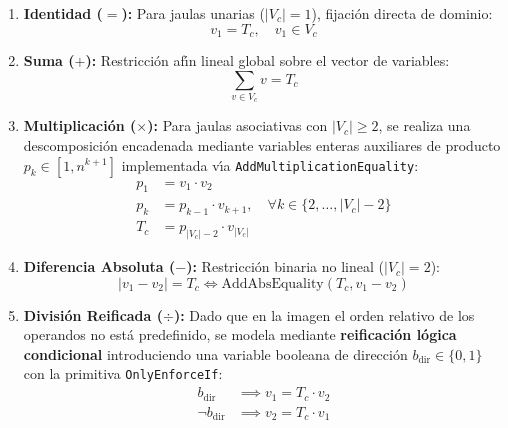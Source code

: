 \begin{enumerate}
    \item \textbf{Identidad ($=$):} Para jaulas unarias ($|V_c| = 1$), fijaci\'on directa de dominio:
    \begin{equation}
        v_1 = T_c, \quad v_1 \in V_c
    \end{equation}

    \item \textbf{Suma ($+$):} Restricci\'on af\'{\i}n lineal global sobre el vector de variables:
    \begin{equation}
        \sum_{v \in V_c} v = T_c
    \end{equation}

    \item \textbf{Multiplicaci\'on ($\times$):} Para jaulas asociativas con $|V_c| \ge 2$, se realiza una descomposici\'on encadenada mediante variables enteras auxiliares de producto $p_k \in [1, n^{k+1}]$ implementada v\'{\i}a \texttt{AddMultiplicationEquality}:
    \begin{align}
        p_1 &= v_1 \cdot v_2 \\
        p_k &= p_{k-1} \cdot v_{k+1}, \quad \forall k \in \{2, \dots, |V_c|-2\} \\
        T_c &= p_{|V_c|-2} \cdot v_{|V_c|}
    \end{align}

    \item \textbf{Diferencia Absoluta ($-$):} Restricci\'on binaria no lineal ($|V_c| = 2$):
    \begin{equation}
        |v_1 - v_2| = T_c \iff \text{AddAbsEquality}(T_c, v_1 - v_2)
    \end{equation}

    \item \textbf{Divisi\'on Reificada ($\div$):} Dado que en la imagen el orden relativo de los operandos no est\'a predefinido, se modela mediante \textbf{reificaci\'on l\'ogica condicional} introduciendo una variable booleana de direcci\'on $b_{\text{dir}} \in \{0, 1\}$ con la primitiva \texttt{OnlyEnforceIf}:
    \begin{align}
        b_{\text{dir}} &\implies v_1 = T_c \cdot v_2 \label{eq:div_reif_1} \\
        \neg b_{\text{dir}} &\implies v_2 = T_c \cdot v_1 \label{eq:div_reif_2}
    \end{align}
\end{enumerate}

